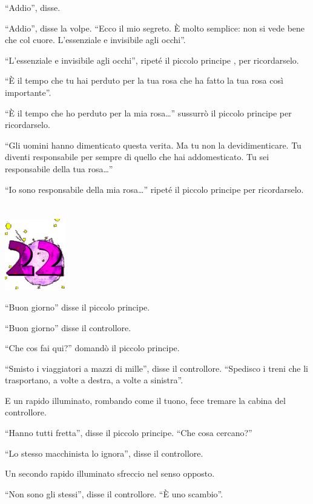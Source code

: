 \documentclass[11pt]{scrbook}
\begin{document}
``Addio'', disse.

``Addio'', disse la volpe. ``Ecco il mio segreto. È molto semplice: non si vede bene che col cuore. L'essenziale e invisibile agli occhi''.

``L'essenziale e invisibile agli occhi'', ripeté il piccolo principe , per ricordarselo.

``È il tempo che tu hai perduto per la tua rosa che ha fatto la tua rosa così importante''.

``È il tempo che ho perduto per la mia rosa\ldots{}'' sussurrò il piccolo principe per ricordarselo.

``Gli uomini hanno dimenticato questa verita. Ma tu non la devidimenticare. Tu diventi responsabile per sempre di quello che hai addomesticato. Tu sei responsabile della tua rosa\ldots{}''

``Io sono responsabile della mia rosa\ldots{}'' ripeté il piccolo principe per ricordarselo.

\chapter{}
\begin{center}
\includegraphics{img/chapter22}
\end{center}

``Buon giorno'' disse il piccolo principe.

``Buon giorno'' disse il controllore.

``Che cos fai qui?'' domandò il piccolo principe.

``Smisto i viaggiatori a mazzi di mille'', disse il controllore. ``Spedisco i treni che li trasportano, a volte a destra, a volte a sinistra''.

E un rapido illuminato, rombando come il tuono, fece tremare la cabina del controllore.

``Hanno tutti fretta'', disse il piccolo principe. ``Che cosa cercano?''

``Lo stesso macchinista lo ignora'', disse il controllore.

Un secondo rapido illuminato sfreccio nel senso opposto.

``Non sono gli stessi'', disse il controllore. ``È uno scambio''.
\end{document}
